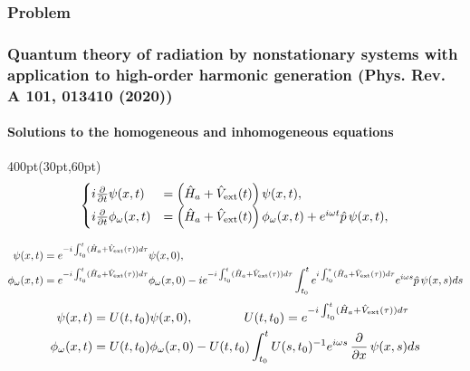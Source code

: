 \begin{frame}
\frametitle{Problem}
\frametitle{Quantum theory of radiation by nonstationary systems 
	with application to high-order harmonic generation
        (Phys. Rev. A 101, 013410 (2020))}
	\framesubtitle{Solutions to the homogeneous and inhomogeneous equations}


\begin{textblock*}{400pt}(30pt,60pt)
\footnotesize
\begin{align}
\begin{cases}
	i\frac{\partial}{\partial t}\psi(x,t)
	   & = \left( \hat{H}_a + \hat{V}_{\rm ext}(t)\right) 
	   \psi(x,t),\\
	i\frac{\partial}{\partial t}\phi_\omega(x,t)
	   & = \left( \hat{H}_a + \hat{V}_{\rm ext}(t)\right) 
	   \phi_\omega (x,t)
 	   + e^{i\omega t} {\hat{p}}\,
	   \psi(x,t), \nonumber
\end{cases}
\end{align}



\begin{align}
\psi(x,t)
 & = e^{-i\int_{t_0}^t (\hat{H}_a + \hat{V}_{\rm ext}(\tau))d\tau}\psi(x,0), \\
\phi_\omega(x,t)
 & = e^{-i\int_{t_0}^t (\hat{H}_a + \hat{V}_{\rm ext}(\tau))d\tau}
   \phi_\omega(x,0) 
  - ie^{-i\int_{t_0}^t (\hat{H}_a + \hat{V}_{\rm ext}(\tau))d\tau}
   \int_{t_0}^t e^{i\int_{t_0}^s (\hat{H}_a + \hat{V}_{\rm ext}(\tau))d\tau}
    e^{i\omega s} \hat{p}\,\psi(x,s) ds
\end{align}                                                            %
\vspace{10pt}
\begin{align}
\psi(x,t)
 & = U(t,t_0)\psi(x,0), \hspace{40pt}
U(t,t_0)=e^{-i\int_{t_0}^{t} (\hat{H}_a 
    + \hat{V}_{\rm ext}(\tau))d\tau} \nonumber\\
\phi_\omega(x,t)
 & = U(t,t_0) \phi_\omega(x,0) 
  - U(t,t_0)\int_{t_0}^{t} U(s,t_0)^{-1}e^{i\omega s}\,\frac{\partial}{\partial x}\,\psi(x,s)ds 
\end{align}                                                            
\end{textblock*}                                                       
                                                                      
\end{frame}                                                          



